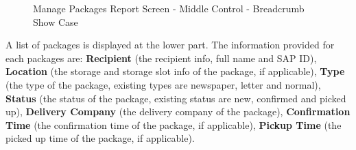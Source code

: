 \begin{figure}[H]
	\centering
	\vspace{10pt}
 

    \vspace{10pt}
	\caption{Manage Packages Report Screen - Middle Control - Breadcrumb Show Case}
	\label{fig:MPBreadCrumb}
\end{figure}

A list of packages is displayed at the lower part. The information provided for each packages are: \textbf{Recipient} (the recipient info, full name and SAP ID), \textbf{Location} (the storage and storage slot info of the package, if applicable), \textbf{Type} (the type of the package, existing types are newspaper, letter and normal), \textbf{Status} (the status of the package, existing status are new, confirmed and picked up), \textbf{Delivery Company} (the delivery company of the package), \textbf{Confirmation Time} (the confirmation time of the package, if applicable), \textbf{Pickup Time} (the picked up time of the package, if applicable).

